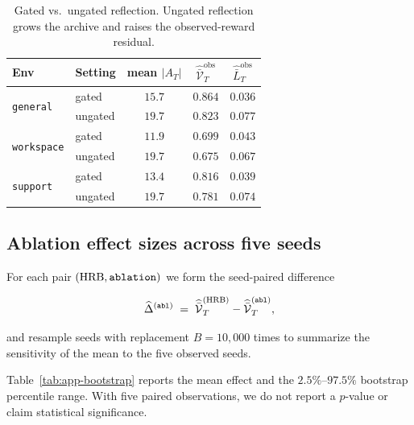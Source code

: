 \documentclass{article} %
\begin{document}
\begin{table}[h]
\centering
\small
\begin{tabular}{llccc}
\toprule
Env & Setting & mean $|A_T|$ & $\widehat{\bar{\mathcal V}}_T^{\mathrm{obs}}$ & $\widehat{\bar L}_T^{\mathrm{obs}}$ \\
\midrule
\multirow{2}{*}{\texttt{general}}
 & gated   & $15.7$ & $0.864$ & $0.036$ \\
 & ungated & $19.7$ & $0.823$ & $0.077$ \\
\midrule
\multirow{2}{*}{\texttt{workspace}}
 & gated   & $11.9$ & $0.699$ & $0.043$ \\
 & ungated & $19.7$ & $0.675$ & $0.067$ \\
\midrule
\multirow{2}{*}{\texttt{support}}
 & gated   & $13.4$ & $0.816$ & $0.039$ \\
 & ungated & $19.7$ & $0.781$ & $0.074$ \\
\bottomrule
\end{tabular}
\caption{Gated vs.\ ungated reflection. Ungated reflection grows the archive
and raises the observed-reward residual.}
\label{tab:app-ungated}
\end{table}

\subsection{Ablation effect sizes across five seeds}

\label{app:tab-bootstrap}

For each pair $(\textnormal{HRB},\texttt{ablation})$ we form the seed-paired difference

\begin{equation}
\label{eq:app-tab-effect}
\widehat\Delta^{(\texttt{abl})} \;=\; \widehat{\bar{\mathcal V}}_T^{(\textnormal{HRB})} - \widehat{\bar{\mathcal V}}_T^{(\texttt{abl})},
\end{equation}

and resample seeds with replacement \(B=10{,}000\) times to summarize the
sensitivity of the mean to the five observed seeds.

Table~\ref{tab:app-bootstrap} reports the mean effect and the \(2.5\%\)--\(97.5\%\)
bootstrap percentile range. With five paired observations, we do not report a
\(p\)-value or claim statistical significance.
\end{document}
